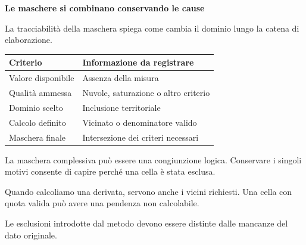 \documentclass[12pt,aspectratio=1610]{beamer}
\newcommand{\PBody}[1]{\par{\fontsize{11.3}{14.8}\selectfont #1\par}}
\newcommand{\PSmall}[1]{\par{\fontsize{9.8}{13.1}\selectfont #1\par}}
\newcommand{\PInfo}[1]{%
\begin{tcolorbox}[enhanced,arc=1.6mm,boxrule=.55pt,colback=GeoTint,
 colframe=Rule!80!Classical,left=2.3mm,right=2.3mm,top=2mm,bottom=2mm,
 before skip=1mm,after skip=1mm]
\PSmall{#1}\end{tcolorbox}}
\begin{document}
\begin{frame}[plain]\hypertarget{slide29}{}
\begin{lrbox}{\TitleBox}
\begin{minipage}[t]{17.7cm}\raggedright\color{Ink}\fontsize{11.3}{14.8}\selectfont
\color{Navy}\bfseries\fontsize{20.6}{24.5}\selectfont Le maschere si combinano conservando le cause
\end{minipage}\end{lrbox}

\begin{lrbox}{\RecallBox}
\begin{minipage}[t]{14.3cm}\raggedright\color{Ink}\fontsize{11.3}{14.8}\selectfont
\fontsize{10.3}{13.8}\selectfont La tracciabilità della maschera spiega come cambia il dominio lungo la catena di elaborazione.
\end{minipage}\end{lrbox}

\begin{lrbox}{\PilotLeftBox}
\begin{minipage}[t]{10.05cm}\raggedright\color{Ink}\fontsize{11.3}{14.8}\selectfont
{\fontsize{10.2}{13.1}\selectfont\renewcommand{\arraystretch}{1.45}\begin{tabular}{@{}p{4.1cm}p{4.9cm}@{}}\toprule
\textbf{Criterio} & \textbf{Informazione da registrare}\\\midrule
Valore disponibile & Assenza della misura\\
Qualità ammessa & Nuvole, saturazione o altro criterio\\
Dominio scelto & Inclusione territoriale\\
Calcolo definito & Vicinato o denominatore valido\\
Maschera finale & Intersezione dei criteri necessari\\
\bottomrule\end{tabular}}

\end{minipage}\end{lrbox}

\begin{lrbox}{\PilotRightBox}
\begin{minipage}[t]{7.55cm}\raggedright\color{Ink}\fontsize{11.3}{14.8}\selectfont
\PBody{La maschera complessiva può essere una congiunzione logica. Conservare i singoli motivi consente di capire perché una cella è stata esclusa.}
\vspace{2.5mm}
\PInfo{Quando calcoliamo una derivata, servono anche i vicini richiesti. Una cella con quota valida può avere una pendenza non calcolabile.}
\PBody{Le esclusioni introdotte dal metodo devono essere distinte dalle mancanze del dato originale.}
\vspace{2.5mm}


\end{minipage}
\end{lrbox}
\end{frame}
\end{document}

